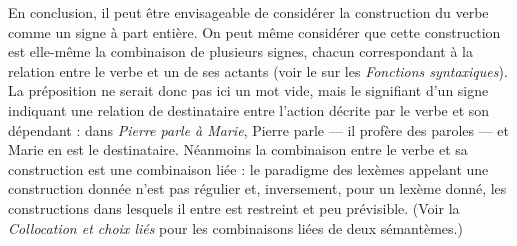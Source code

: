 {    En conclusion, il peut être envisageable de considérer la construction du verbe comme un signe à part entière. On peut même considérer que cette construction est elle-même la combinaison de plusieurs signes, chacun correspondant à la relation entre le verbe et un de ses actants (voir le  sur les \textit{Fonctions syntaxiques}). La préposition ne serait donc pas ici un mot vide, mais le signifiant d’un signe indiquant une relation de destinataire entre l’action décrite par le verbe et son dépendant : dans \textit{Pierre parle à Marie}, Pierre parle — il profère des paroles — et Marie en est le destinataire. Néanmoins la combinaison entre le verbe et sa construction est une combinaison liée : le paradigme des lexèmes appelant une construction donnée n’est pas régulier et, inversement, pour un lexème donné, les constructions dans lesquels il entre est restreint et peu prévisible. (Voir la  \textit{Collocation et choix liés} pour les combinaisons liées de deux sémantèmes.)

}
